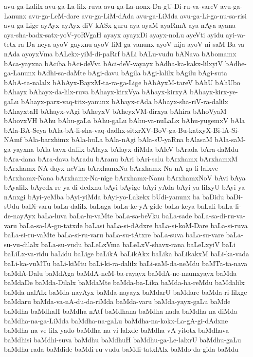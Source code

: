 {avu-ga-Lalilx
avu-ga-La-lilx-ruva
avu-ga-La-nonx-Da-gU-Di-ru-va-vareV
avu-ga-Lanunx
avu-ga-LeM-dare
avu-ga-LiM-dAda
avu-ga-LiMda
avu-ga-Li-ga-nu-sa-risi
avu-ga-Lige
ayAyx
ayAyx-diV-kASx-guru
aya
ayaM
ayaRmA
aya-nAya
ayana
aya-sha-badx-satx-yoV-yoRVgaH
ayayx
ayayxDi
ayayx-noLu
ayeVti
ayidu
ayi-va-tetx-ra-Da-neya
ayoV-gayxnu
ayoV-liM-ga-vanunx
ayoV-nija
ayoV-ni-saM-Ba-va-nAda
ayoyxVma
bALekx-yiM-di-paRrf
bALi
bALu-vudu
bANava
bAbomamx
bAca-yayxna
bAciba
bAci-deVva
bAci-deV-vayayx
bAdha-ka-kakx-lilxyiV
bAdhe-ga-Lanunx
bAdhi-sa-daMte
bAgi-davu
bAgila
bAgi-lalilx
bAgilu
bAgi-suta
bAhA-ta-nalalx
bAhAyx-BayxM-ta-ra-ga-Lige
bAhAyxM-tareV
bAhU
bAhUbo
bAhayx
bAhayx-da-lilx-ruva
bAhayx-kirxVya
bAhayx-kirxyA
bAhayx-kirx-ye-gaLu
bAhayx-parx-vaq-titx-yanunx
bAhayx-rAda
bAhayx-sha-riV-ra-dalilx
bAhayxtaH
bAhayx-vAgi
bAheyxV
bAheyxVM-dirxya
bAhira
bAhoVyaM
bAhovxVH
bAhu
bAhu-gaLa
bAhu-gaLu
bAhu-va-nuLaLx
bAhu-yugemxV
bAla
bAla-BA-Seya
bAla-bA-li-sha-vaq-dadhx-sitxrXV-BoV-ga-Bu-katxyX-Bi-lA-Si-NAmf
bAla-barxhimx
bAla-huLa
bAla-nAgi
bAla-sU-yaRna
bAlasaM
bAla-saM-ga-yayxna
bAla-tavx-dalilx
bAlayx
bAlayx-diMda
bAleV
bArada
bAra-daMdu
bAra-dana
bAra-dava
bAradu
bAranu
bAri
bAri-salu
bArxhamx
bArxhamxM
bArxhamx-NA-dayx-neVka
bArxhamxNa
bArxhamx-Na-nA-ga-li-lalxve
bArxhamx-Nana
bArxhamx-Na-nige
bArxhamx-Nanu
bArxhamxNoV
bAvi
bAya
bAyalilx
bAyedx-re-ya-di-dedxnu
bAyi
bAyige
bAyi-yAda
bAyi-ya-lilxyU
bAyi-ya-nAnxgi
bAyi-yeMba
bAyi-yiMda
bAyi-yo-Lakekx
bUdi-yanunx
ba
baDidu
baDi-sUdu
baDi-varu
baLa-dalilx
baLaga
baLa-ke-yA-gide
baLa-keya
baLali
baLa-li-de-nayAyx
baLa-luva
baLa-lu-vaMte
baLa-sa-beVku
baLa-sade
baLa-sa-di-ru-va-varu
baLa-sa-lA-gu-tatxde
baLasi
baLa-si-dAdxre
baLa-si-koM-Dare
baLa-si-ruva
baLa-si-ru-vaMte
baLa-si-ru-varu
baLa-su-tAtxre
baLa-suva
baLa-su-vare
baLa-su-vu-dilalx
baLa-su-vudu
baLeLxVma
baLeLxV-shavx-rana
baLeLxyiV
baLi
baLiLx-va-ridu
baLidu
baLige
baLikA
baLikAkx
baLika
baLikakxM
baLi-ka-vada
baLi-ka-vuMTu
baLi-kiMtu
baLi-ki-ra-dalilx
baLi-saM-da-neMdu
baMTa-ta-nava
baMdA-Dalu
baMdAga
baMdA-neM-ba-rayayx
baMdA-ne-mamxyayx
baMda
baMdaDe
baMda-Dilalx
baMdaMte
baMda-ba-Lika
baMda-ha-reMdu
baMdalilx
baMda-nalAlx
baMda-nayAyx
baMda-nayayx
baMdarU
baMdare
baMda-ri-lilxge
baMdaru
baMda-va-nA-du-da-riMda
baMda-varu
baMda-yayx-gaLu
baMde
baMdha
baMdhaH
baMdha-nAtf
baMdhana
baMdha-nada
baMdha-na-diMda
baMdha-na-ga-LiMda
baMdha-na-gaLu
baMdha-na-kokx-La-gA-gi-dAdxne
baMdha-na-ve-lilx-yado
baMdha-na-vi-lalxde
baMdha-vA-yitotx
baMdhava
baMdhisi
baMdhi-suva
baMdhu
baMdhuH
baMdhu-ga-Le-lalxrU
baMdhu-gaLu
baMdhu-rada
baMdide
baMdi-ru-vudu
baMdi-tatxlAlx
baMdo-da-gida
baMdu
}

